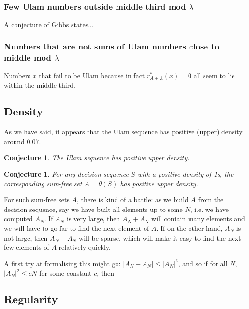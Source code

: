 \documentclass{article}
\newtheorem{conjecture}[theorem]{Conjecture}
\theoremstyle{definition}
\theoremstyle{remark}
\numberwithin{equation}{section}
\begin{document}
{\color{red}

\subsubsection{Few Ulam numbers outside middle third mod $\lambda$}

A conjecture of Gibbs states...

\subsubsection{Numbers that are not sums of Ulam numbers close to middle mod $\lambda$}

Numbers $x$ that fail to be Ulam because in fact $r^*_{A+A}(x) = 0$
all seem to lie within the middle third.  


\subsection{Density}

As we have said, it appears that the Ulam sequence has positive
(upper) density around $0.07$.  

\begin{conjecture}
The Ulam sequence has positive upper density.
\end{conjecture}


\begin{conjecture}
  For any decision sequence $S$ with a positive density of 1s, the
  corresponding sum-free set $A = \theta(S)$ has positive upper density.
\end{conjecture}

For such sum-free sets $A$, there is kind of a battle: as we build $A$
from the decision sequence, say we have built all elements up to some
$N$, i.e. we have computed $A_N$.  If $A_N$ is very large, then
$A_N+A_N$ will contain many elements and we will have to go far to
find the next element of $A$.  If on the other hand, $A_N$ is not
large, then $A_N + A_N$ will be sparse, which will make it easy to
find the next few elements of $A$ relatively quickly.  

A first try at formalising this might go: $|A_N + A_N| \leq |A_N|^2$,
and so if for all $N$, $|A_N|^2 \leq cN$ for some constant $c$, then


\subsection{Regularity}

}
\end{document}
